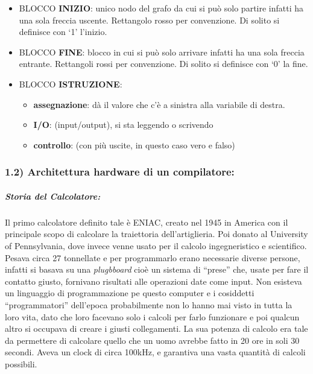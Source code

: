 \documentclass[
  paper=a4,
  oneside  ,captions=tableheading
]{scrbook}
\providecommand{\tightlist}{%
  \setlength{\itemsep}{0pt}\setlength{\parskip}{0pt}}
\begin{document}
\begin{itemize}
\tightlist
\item
  BLOCCO \textbf{INIZIO}: unico nodo del grafo da cui si può solo
  partire infatti ha una sola freccia uscente. Rettangolo rosso per
  convenzione. Di solito si definisce con `1' l'inizio.
\item
  BLOCCO \textbf{FINE}: blocco in cui si può solo arrivare infatti ha
  una sola freccia entrante. Rettangoli rossi per convenzione. Di solito
  si definisce con `0' la fine.
\item
  BLOCCO \textbf{ISTRUZIONE}:

  \begin{itemize}
  \tightlist
  \item
    \textbf{assegnazione}: dà il valore che c'è a sinistra alla
    variabile di destra.
  \item
    \textbf{I/O}: (input/output), si sta leggendo o scrivendo
  \item
    \textbf{controllo}: (con più uscite, in questo caso vero e falso)
  \end{itemize}
\end{itemize}

\hypertarget{architettura-hardware-di-un-compilatore}{%
\subsubsection{1.2) Architettura hardware di un
compilatore:}\label{architettura-hardware-di-un-compilatore}}

\hypertarget{storia-del-calcolatore}{%
\subparagraph{Storia del Calcolatore:}\label{storia-del-calcolatore}}

Il primo calcolatore definito tale è ENIAC, creato nel 1945 in America
con il principale scopo di calcolare la traiettoria dell'artiglieria.
Poi donato al University of Pennsylvania, dove invece venne usato per il
calcolo ingegneristico e scientifico. Pesava circa 27 tonnellate e per
programmarlo erano necessarie diverse persone, infatti si basava su una
\emph{plugbboard} cioè un sistema di ``prese'' che, usate per fare il
contatto giusto, fornivano risultati alle operazioni date come input.
Non esisteva un linguaggio di programmazione pe questo computer e i
cosiddetti ``programmatori'' dell'epoca probabilmente non lo hanno mai
visto in tutta la loro vita, dato che loro facevano solo i calcoli per
farlo funzionare e poi qualcun altro si occupava di creare i giusti
collegamenti. La sua potenza di calcolo era tale da permettere di
calcolare quello che un uomo avrebbe fatto in 20 ore in soli 30 secondi.
Aveva un clock di circa 100kHz, e garantiva una vasta quantità di
calcoli possibili.
\end{document}
